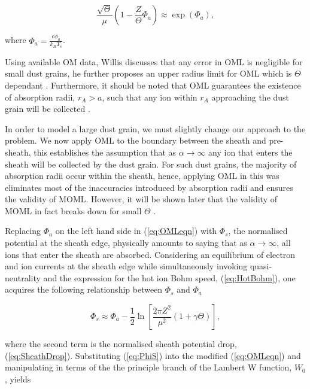 \documentclass{article}
\begin{document}
\begin{equation}\label{eq:OMLeqn}
\frac{\sqrt{\Theta}}{\mu} \left(1 - \frac{Z}{\Theta}\Phi_a \right) \approx \exp{\left(\Phi_a\right)},
\end{equation}

\smallskip

\noindent where $\Phi_a = \frac{e\phi_a}{k_B T_e}$.

\medskip

Using available OM data, Willis discusses that any error in OML is negligible for small dust grains,
he further proposes an upper radius limit for OML which is $\Theta$ dependant \cite{Willis}. Furthermore, it should be noted that
OML guarantees the existence of absorption radii, $r_{A} > a$, such that any 
ion within $r_{A}$ approaching the dust grain will be collected \cite{Thomas}. 

\medskip

In order to model a large dust grain, we must slightly change our approach to the problem.
We now apply OML to the boundary between the sheath and pre-sheath, this establishes
the assumption that as $\alpha \to \infty$ any ion that enters the sheath will be 
collected by the dust grain. For such dust grains, the majority of absorption
radii occur within the sheath, hence, applying OML in this was eliminates most of the inaccuracies introduced 
by absorption radii and ensures the validity of MOML. However, it will be shown later that the validity of MOML in fact breaks down for small
$\Theta$ \cite{Thomas}. 

\medskip

Replacing $\Phi_a$ on the left hand side in (\ref{eq:OMLeqn}) with $\Phi_s$, the normalised potential
at the sheath edge, physically amounts to
saying that as $\alpha \to \infty$, all ions that enter the sheath are absorbed. Considering an equilibrium of
electron and ion currents at the sheath edge while simultaneously invoking quasi-neutrality 
and the expression for the hot ion Bohm speed, (\ref{eq:HotBohm}), one acquires the following 
relationship between $\Phi_s$ and $\Phi_a$

\begin{equation}\label{eq:PhiS}
\Phi_s \approx \Phi_a - \frac{1}{2}\ln{\left[\frac{2\pi Z^2}{\mu^2}(1 + \gamma \Theta)\right]},
\end{equation}

\noindent where the second term is the normalised sheath potential drop, (\ref{eq:SheathDrop}).
Substituting (\ref{eq:PhiS}) into the modified (\ref{eq:OMLeqn}) and manipulating in terms of
the the principle branch of the Lambert W function, $W_0$, yields 
\end{document}
